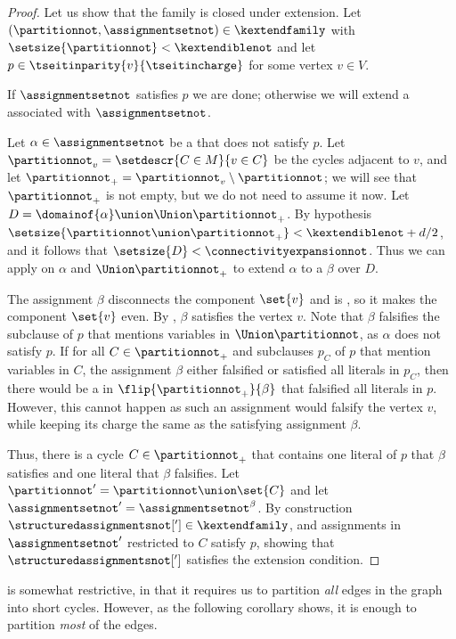 \documentclass{toc}
\begin{document}
\begin{proof}
  Let us show that the family is closed under extension. Let $(\partitionnot,\assignmentsetnot)\in\kextendfamily$ with $\setsize{\partitionnot} < \kextendiblenot$ and let $p\in\tseitinparity{v}{\tseitincharge}$ for some vertex $v\in V$.

  If $\assignmentsetnot$ satisfies $p$ we are done; otherwise we will extend a \nonsplittingassignment associated with $\assignmentsetnot$.

  Let $\alpha\in\assignmentsetnot$ be a \nonsplittingassignment that does not satisfy $p$. Let $\partitionnot_v=\setdescr{C\in M}{v\in C}$ be the cycles adjacent to $v$, and let $\partitionnot_+=\partitionnot_v\setminus\partitionnot$; we will see that $\partitionnot_+$ is not empty, but we do not need to assume it now. Let $D=\domainof{\alpha}\union\Union\partitionnot_+$. By hypothesis $\setsize{\partitionnot\union\partitionnot_+} < \kextendiblenot + d/2$, and it follows that $\setsize{D} < \connectivityexpansionnot$. Thus we can apply  on $\alpha$ and $\Union\partitionnot_+$ to extend $\alpha$ to a \nonsplittingassignment $\beta$ over $D$.

The assignment $\beta$ disconnects the component $\set{v}$ and is \nonsplitting, so it makes the component $\set{v}$ even. By , $\beta$ satisfies the vertex $v$. Note that $\beta$ falsifies the subclause of $p$ that mentions variables in $\Union\partitionnot$, as $\alpha$ does not satisfy $p$. If for all $C\in\partitionnot_+$ and subclauses $p_C$ of $p$ that mention variables in $C$, the assignment $\beta$ either falsified or satisfied all literals in $p_C$, then there would be a \nonsplittingassignment in $\flip{\partitionnot_+}{\beta}$ that falsified all literals in $p$. However, this cannot happen as such an assignment would falsify the vertex $v$, while keeping its charge the same as the satisfying assignment $\beta$.

Thus, there is a cycle $C\in\partitionnot_+$ that contains one literal of $p$ that $\beta$ satisfies and one literal that $\beta$ falsifies. Let $\partitionnot'=\partitionnot\union\set{C}$ and let $\assignmentsetnot'=\assignmentsetnot^\beta$. By construction $\structuredassignmentsnot['] \in \kextendfamily$, and assignments in $\assignmentsetnot'$ restricted to $C$ satisfy $p$, showing that $\structuredassignmentsnot[']$ satisfies the extension condition.
\end{proof}

 is somewhat restrictive, in that it requires us to partition \emph{all} edges in the graph into short cycles. However, as the following corollary shows, it is enough to partition \emph{most} of the edges.
\end{document}

